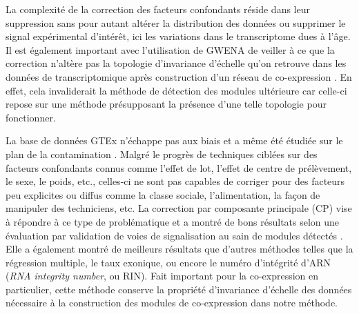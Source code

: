 La complexité de la correction des facteurs confondants réside dans leur suppression sans pour autant altérer la distribution des données ou supprimer le signal expérimental d'intérêt, ici les variations dans le transcriptome dues à l'âge. Il est également important avec l'utilisation de GWENA de veiller à ce que la correction n'altère pas la topologie d'invariance d'échelle qu'on retrouve dans les données de transcriptomique après construction d'un réseau de co-expression . En effet, cela invaliderait la méthode de détection des modules ultérieure car celle-ci repose sur une méthode présupposant la présence d'une telle topologie pour fonctionner.


La base de données GTEx n'échappe pas aux biais  et a même été étudiée sur le plan de la contamination .
Malgré le progrès de techniques ciblées sur des facteurs confondants connus comme l'effet de lot, l'effet de centre de prélèvement, le sexe, le poids, etc., celles-ci ne sont pas capables de corriger pour des facteurs peu explicites ou diffus comme la classe sociale, l'alimentation, la façon de manipuler des techniciens, etc. La correction par composante principale (CP) vise à répondre à ce type de problématique et a montré de bons résultats selon une évaluation par validation de voies de signalisation au sain de modules détectés . Elle a également montré de meilleurs résultats que d'autres méthodes telles que la régression multiple, le taux exonique, ou encore le numéro d'intégrité d'ARN (\textit{RNA integrity number}, ou RIN). Fait important pour la co-expression en particulier, cette méthode conserve la propriété d'invariance d'échelle des données nécessaire à la construction des modules de co-expression dans notre méthode.

